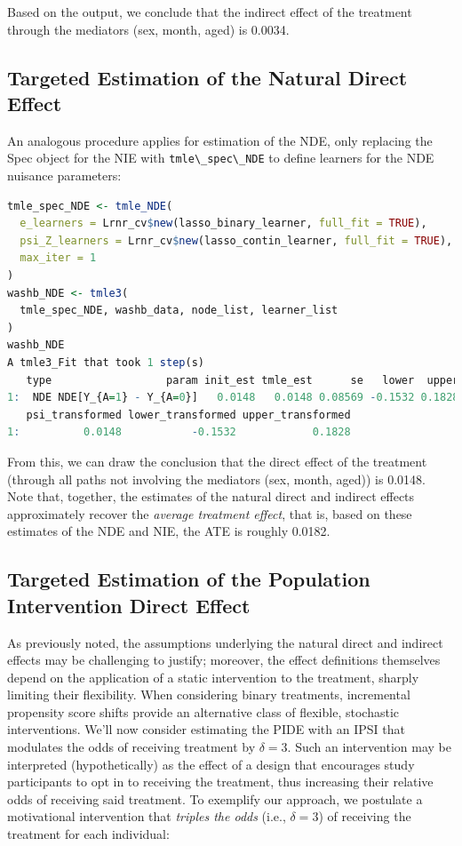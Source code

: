 \documentclass[
  12pt, krantz2,
]{krantz}
\newcommand{\passthrough}[1]{#1}
\newcommand{\1}{\mathbbm{1}}
\theoremstyle{definition}
\theoremstyle{definition}
\theoremstyle{definition}
\theoremstyle{definition}
\theoremstyle{remark}
\begin{document}
Based on the output, we conclude that the indirect effect of the treatment
through the mediators (sex, month, aged) is
0.0034.

\hypertarget{targeted-estimation-of-the-natural-direct-effect}{%
\subsection{Targeted Estimation of the Natural Direct Effect}\label{targeted-estimation-of-the-natural-direct-effect}}

An analogous procedure applies for estimation of the NDE, only replacing the
Spec object for the NIE with \passthrough{\lstinline!tmle\_spec\_NDE!} to define learners for the NDE
nuisance parameters:

\begin{lstlisting}[language=R]
tmle_spec_NDE <- tmle_NDE(
  e_learners = Lrnr_cv$new(lasso_binary_learner, full_fit = TRUE),
  psi_Z_learners = Lrnr_cv$new(lasso_contin_learner, full_fit = TRUE),
  max_iter = 1
)
washb_NDE <- tmle3(
  tmle_spec_NDE, washb_data, node_list, learner_list
)
washb_NDE
A tmle3_Fit that took 1 step(s)
   type                  param init_est tmle_est      se   lower  upper
1:  NDE NDE[Y_{A=1} - Y_{A=0}]   0.0148   0.0148 0.08569 -0.1532 0.1828
   psi_transformed lower_transformed upper_transformed
1:          0.0148           -0.1532            0.1828
\end{lstlisting}

From this, we can draw the conclusion that the direct effect of the treatment
(through all paths not involving the mediators (sex, month, aged)) is
0.0148. Note that, together, the estimates of
the natural direct and indirect effects approximately recover the \emph{average
treatment effect}, that is, based on these estimates of the NDE and NIE, the
ATE is roughly
0.0182.

\hypertarget{targeted-estimation-of-the-population-intervention-direct-effect}{%
\subsection{Targeted Estimation of the Population Intervention Direct Effect}\label{targeted-estimation-of-the-population-intervention-direct-effect}}

As previously noted, the assumptions underlying the natural direct and indirect
effects may be challenging to justify; moreover, the effect definitions
themselves depend on the application of a static intervention to the treatment,
sharply limiting their flexibility. When considering binary treatments,
incremental propensity score shifts provide an alternative class of flexible,
stochastic interventions. We'll now consider estimating the PIDE with an IPSI
that modulates the odds of receiving treatment by \(\delta = 3\). Such an
intervention may be interpreted (hypothetically) as the effect of a design that
encourages study participants to opt in to receiving the treatment, thus
increasing their relative odds of receiving said treatment. To exemplify our
approach, we postulate a motivational intervention that \emph{triples the odds}
(i.e., \(\delta = 3\)) of receiving the treatment for each individual:
\end{document}
